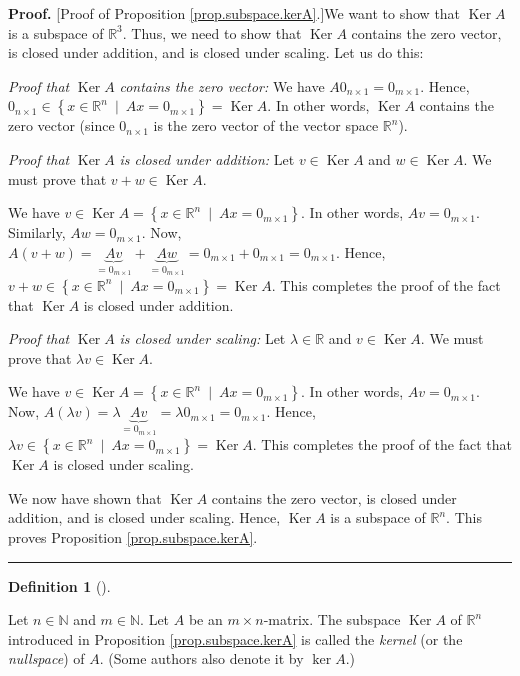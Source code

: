 \documentclass[numbers=enddot,12pt,final,onecolumn,notitlepage]{scrartcl}%
\theoremstyle{definition}
\newtheorem{defi}[theo]{Definition}
\newenvironment{definition}[1][]
{\begin{defi}[#1]\begin{leftbar}}
{\end{leftbar}\end{defi}}
\newenvironment{proof}[1][Proof]{\noindent\textbf{#1.} }{\ \rule{0.5em}{0.5em}}
\begin{document}
\begin{proof}
[Proof of Proposition \ref{prop.subspace.kerA}.]We want to show that
$\operatorname*{Ker}A$ is a subspace of $\mathbb{R}^{3}$. Thus, we need to
show that $\operatorname*{Ker}A$ contains the zero vector, is closed under
addition, and is closed under scaling. Let us do this:

\textit{Proof that }$\operatorname*{Ker}A$\textit{ contains the zero vector:}
We have $A0_{n\times1}=0_{m\times1}$. Hence, $0_{n\times1}\in\left\{
x\in\mathbb{R}^{n}\ \mid\ Ax=0_{m\times1}\right\}  =\operatorname*{Ker}A$. In
other words, $\operatorname*{Ker}A$ contains the zero vector (since
$0_{n\times1}$ is the zero vector of the vector space $\mathbb{R}^{n}$).

\textit{Proof that }$\operatorname*{Ker}A$ \textit{is closed under addition:}
Let $v\in\operatorname*{Ker}A$ and $w\in\operatorname*{Ker}A$. We must prove
that $v+w\in\operatorname*{Ker}A$.

We have $v\in\operatorname*{Ker}A=\left\{  x\in\mathbb{R}^{n}\ \mid
\ Ax=0_{m\times1}\right\}  $. In other words, $Av=0_{m\times1}$. Similarly,
$Aw=0_{m\times1}$. Now, $A\left(  v+w\right)  =\underbrace{Av}_{=0_{m\times1}%
}+\underbrace{Aw}_{=0_{m\times1}}=0_{m\times1}+0_{m\times1}=0_{m\times1}$.
Hence, $v+w\in\left\{  x\in\mathbb{R}^{n}\ \mid\ Ax=0_{m\times1}\right\}
=\operatorname*{Ker}A$. This completes the proof of the fact that
$\operatorname*{Ker}A$ is closed under addition.

\textit{Proof that }$\operatorname*{Ker}A$ \textit{is closed under scaling:}
Let $\lambda\in\mathbb{R}$ and $v\in\operatorname*{Ker}A$. We must prove that
$\lambda v\in\operatorname*{Ker}A$.

We have $v\in\operatorname*{Ker}A=\left\{  x\in\mathbb{R}^{n}\ \mid
\ Ax=0_{m\times1}\right\}  $. In other words, $Av=0_{m\times1}$. Now,
$A\left(  \lambda v\right)  =\lambda\underbrace{Av}_{=0_{m\times1}}%
=\lambda0_{m\times1}=0_{m\times1}$. Hence, $\lambda v\in\left\{
x\in\mathbb{R}^{n}\ \mid\ Ax=0_{m\times1}\right\}  =\operatorname*{Ker}A$.
This completes the proof of the fact that $\operatorname*{Ker}A$ is closed
under scaling.

We now have shown that $\operatorname*{Ker}A$ contains the zero vector, is
closed under addition, and is closed under scaling. Hence,
$\operatorname*{Ker}A$ is a subspace of $\mathbb{R}^{n}$. This proves
Proposition \ref{prop.subspace.kerA}.
\end{proof}

\begin{definition}
\label{def.subspace.kerA}Let $n\in\mathbb{N}$ and $m\in\mathbb{N}$. Let $A$ be
an $m\times n$-matrix. The subspace $\operatorname*{Ker}A$ of $\mathbb{R}^{n}$
introduced in Proposition \ref{prop.subspace.kerA} is called the
\textit{kernel} (or the \textit{nullspace}) of $A$. (Some authors also denote
it by $\ker A$.)
\end{definition}
\end{document}
